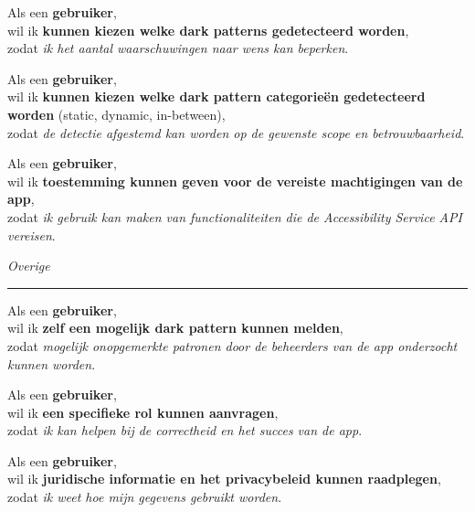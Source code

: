Als een \textbf{gebruiker}, \\
wil ik \textbf{kunnen kiezen welke dark patterns gedetecteerd worden}, \\
zodat \textit{ik het aantal waarschuwingen naar wens kan beperken}.

\vspace{1em}

Als een \textbf{gebruiker}, \\
wil ik \textbf{kunnen kiezen welke dark pattern categorieën gedetecteerd worden} (static, dynamic, in-between), \\
zodat \textit{de detectie afgestemd kan worden op de gewenste scope en betrouwbaarheid}.

\vspace{1em}

Als een \textbf{gebruiker}, \\
wil ik \textbf{toestemming kunnen geven voor de vereiste machtigingen van de app}, \\
zodat \textit{ik gebruik kan maken van functionaliteiten die de Accessibility Service API vereisen}.


\vspace{1.2em}

\textit{Overige}
\vspace{0.5em}
\hrule
\vspace{1.2em}

Als een \textbf{gebruiker}, \\
wil ik \textbf{zelf een mogelijk dark pattern kunnen melden}, \\
zodat \textit{mogelijk onopgemerkte patronen door de beheerders van de app onderzocht kunnen worden}.

\vspace{1em}

Als een \textbf{gebruiker}, \\
wil ik \textbf{een specifieke rol kunnen aanvragen}, \\
zodat \textit{ik kan helpen bij de correctheid en het succes van de app}.

\vspace{1em}

Als een \textbf{gebruiker}, \\
wil ik \textbf{juridische informatie en het privacybeleid kunnen raadplegen}, \\
zodat \textit{ik weet hoe mijn gegevens gebruikt worden}.



\vspace{1.5em}

